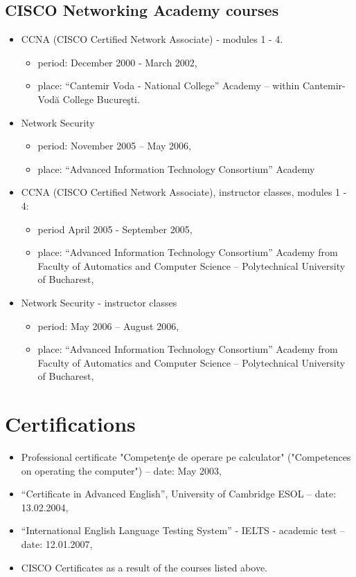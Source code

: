 \documentclass[a4paper,12pt,openany]{article}
\begin{document}
	\subsection{CISCO Networking Academy courses}
		\begin{itemize}
		 	\item CCNA  (CISCO Certified Network Associate) - modules 1 - 4. 
			\begin{itemize}
				\item period: December 2000 - March 2002,
				\item place: “Cantemir Voda - National College”  Academy – within Cantemir-Vodă College Bucureşti.                                     
			\end{itemize}
			\item Network Security
			\begin{itemize}
				\item period: November 2005 – May 2006,
				\item place: “Advanced Information Technology Consortium” Academy
			\end{itemize}
			\item CCNA (CISCO Certified Network Associate), instructor classes, modules 1 - 4:
			\begin{itemize}
 				\item period April 2005 - September 2005,
				\item place: “Advanced Information Technology Consortium” Academy from Faculty of Automatics and Computer Science – Polytechnical University of Bucharest,
			\end{itemize}
			\item Network Security - instructor classes
			\begin{itemize}
			 	\item period: May 2006 – August 2006,
				\item place: “Advanced Information Technology Consortium” Academy from Faculty of Automatics and Computer Science – Polytechnical University of Bucharest,
			\end{itemize}
		\end{itemize}
\newpage
\section{Certifications}
		\begin{itemize}
		 	\item Professional certificate "Competenţe de operare pe calculator" ("Competences on operating the computer") – date: May 2003,
			\item “Certificate in Advanced English”, University of Cambridge ESOL – date: 13.02.2004,
			\item “International English Language Testing System” - IELTS - academic test – date: 12.01.2007,
			\item CISCO Certificates as a result of the courses listed above.
		\end{itemize}
	
\end{document}
